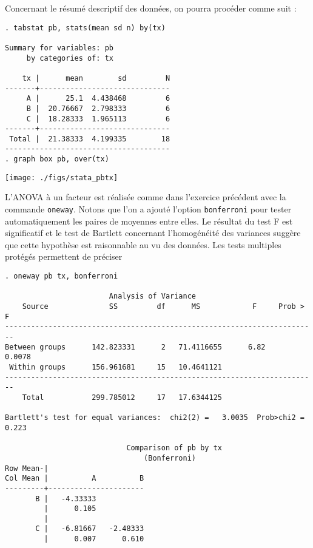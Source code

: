 Concernant le résumé descriptif des données, on pourra procéder comme suit :
\begin{verbatim}
. tabstat pb, stats(mean sd n) by(tx)

Summary for variables: pb
     by categories of: tx 

    tx |      mean        sd         N
-------+------------------------------
     A |      25.1  4.438468         6
     B |  20.76667  2.798333         6
     C |  18.28333  1.965113         6
-------+------------------------------
 Total |  21.38333  4.199335        18
--------------------------------------
. graph box pb, over(tx)
\end{verbatim}

\texttt{[image: ./figs/stata\_pbtx]}

L'ANOVA à un facteur est réalisée comme dans l'exercice précédent avec la
commande \texttt{oneway}. Notons que l'on a ajouté l'option
\texttt{bonferroni} pour tester automatiquement les paires de moyennes entre
elles. Le résultat du test F est significatif et le test de Bartlett
concernant l'homogénéité des variances suggère que cette hypothèse est
raisonnable au vu des données. Les tests multiples protégés permettent de
préciser 
\begin{verbatim}
. oneway pb tx, bonferroni

                        Analysis of Variance
    Source              SS         df      MS            F     Prob > F
------------------------------------------------------------------------
Between groups      142.823331      2   71.4116655      6.82     0.0078
 Within groups      156.961681     15   10.4641121
------------------------------------------------------------------------
    Total           299.785012     17   17.6344125

Bartlett's test for equal variances:  chi2(2) =   3.0035  Prob>chi2 = 0.223

                            Comparison of pb by tx
                                (Bonferroni)
Row Mean-|
Col Mean |          A          B
---------+----------------------
       B |   -4.33333
         |      0.105
         |
       C |   -6.81667   -2.48333
         |      0.007      0.610
\end{verbatim}

